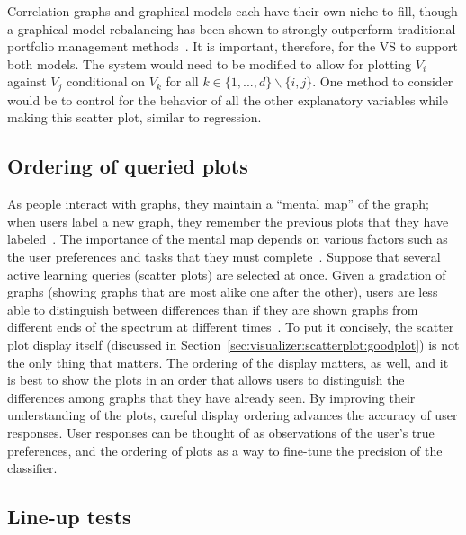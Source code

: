 Correlation graphs and graphical models 
each have their own niche to fill, though a graphical model rebalancing has 
been shown to strongly outperform traditional portfolio management 
methods~\cite{liuh2016}. It is important, therefore, for the VS to 
support both models. The system would need to be modified to allow for plotting 
$V_i$ against $V_j$ conditional on $V_k$ for all $k\in\{1,...,d\} \backslash 
\{i,j\}$. One method to consider would be to control for the behavior of all 
the other explanatory variables while making this scatter plot, similar to 
regression.

\subsection{Ordering of queried plots}
\label{sec:futurework:ordering}

As people interact with graphs, they maintain a ``mental map'' of the 
graph; when users label a new graph, they remember the previous plots that they
have labeled~\cite{federico2016}. The importance of the mental map depends on
various factors such as the user preferences and tasks that they must
complete~\cite{federico2016}. Suppose that several active learning queries 
(scatter plots) are selected at once. Given a gradation of graphs (showing 
graphs that are most alike one after the other), users are less able to 
distinguish between differences than if they are shown graphs from different 
ends of the spectrum at different times~\cite{federico2016}. To put it 
concisely, the scatter plot display itself (discussed in 
Section~\ref{sec:visualizer:scatterplot:goodplot}) is not the only thing that 
matters. The ordering of the display matters, as well, and it is best to show 
the plots in an order that allows users to distinguish the differences among 
graphs that they have already seen. By improving their understanding of the 
plots, careful display ordering advances the accuracy of user responses. User 
responses can be thought of as observations of the user’s true preferences, and 
the ordering of plots as a way to fine-tune the precision of the classifier. 

\subsection{Line-up tests}
\label{sec:futurework:lineup}

